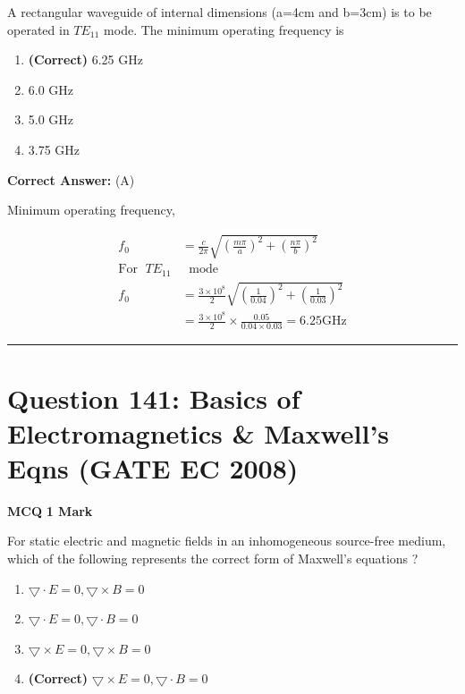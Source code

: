 \documentclass[11pt,a4paper]{article}
\begin{document}
\noindent A rectangular waveguide of internal dimensions (a=4cm and b=3cm) is to
be operated in $TE_{11}$ mode. The minimum operating frequency is


\begin{enumerate}[label=(\Alph*)]
    \item \textbf{(Correct)} 6.25 GHz
    \item 6.0 GHz
    \item 5.0 GHz
    \item 3.75 GHz
\end{enumerate}

\noindent \textbf{Correct Answer:} (A)

\begin{tcolorbox}[solbox, title=Detailed Solution -- Question 140]
Minimum operating frequency,

\[
\begin{aligned} f_{0}&=\frac{c}{2 \pi} \sqrt{\left(\frac{m \pi}{a}\right)^{2}+\left(\frac{n \pi}{b}\right)^{2}}\\ \text{For }\;T E_{11}&\;\text{ mode}\\ f_{0} &=\frac{3 \times 10^{8}}{2} \sqrt{\left(\frac{1}{0.04}\right)^{2}+\left(\frac{1}{0.03}\right)^{2}} \\ &=\frac{3 \times 10^{8}}{2} \times \frac{0.05}{0.04 \times 0.03}=6.25 \mathrm{GHz} \end{aligned}
\]
\end{tcolorbox}

\vspace{1.5em}
\hrule
\vspace{1.5em}

\section*{Question 141: Basics of Electromagnetics \& Maxwell's Eqns (GATE EC 2008)}
\noindent \textbf{\color{primary}MCQ} \hfill \textbf{\color{secondary}1 Mark}


\noindent For static electric and magnetic fields in an inhomogeneous source-free medium, which of the following represents the correct form of Maxwell's equations ?


\begin{enumerate}[label=(\Alph*)]
    \item $\bigtriangledown \cdot E=0,\bigtriangledown \times B=0$
    \item $\bigtriangledown \cdot E=0,\bigtriangledown \cdot B=0$
    \item $\bigtriangledown  \times  E=0,\bigtriangledown  \times B=0$
    \item \textbf{(Correct)} $\bigtriangledown  \times  E=0,\bigtriangledown \cdot B=0$
\end{enumerate}
\end{document}
